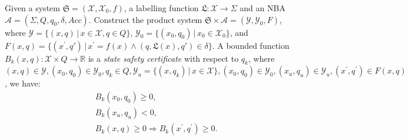 \documentclass[acmlarge]{acmart}
\begin{document}
\begin{definition}
  \label{state-safety-certificate-definition}
  Given a system $\mathfrak{S} = (\mathcal{X}, \mathcal{X}_0, f)$, a labelling function $\mathfrak{L}:\mathcal{X} \rightarrow \Sigma$ and an NBA $\mathcal{A}=(\Sigma, Q, q_0, \delta, Acc)$. Construct the product system $\mathfrak{S} \times \mathcal{A} = (\mathcal{Y}, \mathcal{Y}_0, F)$, where $\mathcal{Y} = \{(x, q) \,|\, x \in \mathcal{X}, q \in Q \}$, $\mathcal{Y}_0 = \{ (x_0, q_0) \,|\, x_0 \in \mathcal{X}_0 \}$, and $F(x,q) = \{(x^{\prime}, q') \,|\, x^{\prime} = f(x) \land (q, \mathfrak{L}(x), q') \in \delta\}$. A bounded function $B_{k}(x, q): \mathcal{X} \times Q \rightarrow \mathbb{R}$ is a \emph{state safety certificate} with respect to $q_k$, where $(x,q) \in \mathcal{Y}, (x_0, q_0) \in \mathcal{Y}_0, q_k \in Q, \mathcal{Y}_u = \{(x, q_k) \,|\, x \in \mathcal{X}\}, (x_0, q_0) \in \mathcal{Y}_0, (x_u, q_u) \in \mathcal{Y}_u, (x^{\prime}, q^{\prime}) \in F(x, q)$, we have:
  \begin{align}
    &B_{k}(x_0, q_0) \geq 0, \label{bsinn1} \\ %
    &B_{k}(x_u, q_u) < 0, \label{bsun1} \\ %
    &B_{k}(x, q) \geq 0 \Rightarrow B_{k}(x^{\prime}, q^{\prime}) \geq 0. \label{bstnn1} %
  \end{align}
\end{definition}





\end{document}

